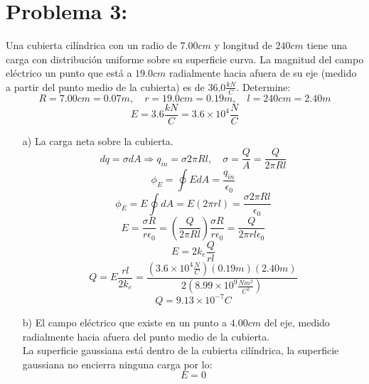 \documentclass[12pt]{article}
\begin{document}
		\section{Problema 3:}\label{sec:Problema3}
			Una cubierta cilíndrica con un radio de $ 7.00cm $ y longitud de $ 240cm $ tiene una carga 
			con distribución uniforme sobre su superficie curva. La magnitud del campo eléctrico 
			un punto que está a $ 19.0cm $ radialmente hacia afuera de su eje (medido a partir 
			del punto medio de la cubierta) es de $ 36.0 \frac{kN}{C} $. Determine:
			$$ R = 7.00cm = 0.07m, \quad r = 19.0cm = 0.19m, \quad l = 240cm = 2.40m $$
			$$ E = 3.6 \frac{kN}{C} = 3.6 \times 10^4 \frac{N}{C} $$
			\begin{enumerate}
				\item[a)]	La carga neta sobre la cubierta.
						$$ dq = \sigma dA \Longrightarrow q_{in} = \sigma 2 \pi R l, \quad \sigma = \frac{Q}{A} = \frac{Q}{2 \pi R l} $$
						$$ \phi_E = \oint EdA = \frac{q_{in}}{\epsilon_0} $$
						$$ \phi_E = E \oint dA = E(2 \pi r l ) = \frac{\sigma 2 \pi R l}{\epsilon_0} $$
						$$ E = \frac{\sigma R}{r \epsilon_0} =  \left( \frac{Q}{2 \pi R l} \right) \frac{\sigma R}{r \epsilon_0} = \frac{Q}{2 \pi r l \epsilon_0} $$
						$$ E = 2 k_e \frac{Q}{rl} $$
						$$ Q = E\frac{rl}{2k_e} = \frac{(3.6 \times 10^4 \frac{N}{C})(0.19m)(2.40m)}{2(8.99 \times 10^9 \frac{Nm^2}{C^2})} $$
						$$ Q = 9.13 \times 10^{-7} C $$
				\item[b)] El campo eléctrico que existe en un punto a $ 4.00cm $ del eje, medido 
						radialmente hacia afuera del punto medio de la cubierta. \\
						La superficie gaussiana está dentro de la cubierta cilíndrica, la superficie 
						gaussiana no encierra ninguna carga por lo:
						$$ E = 0 $$
			\end{enumerate}
\end{document}
